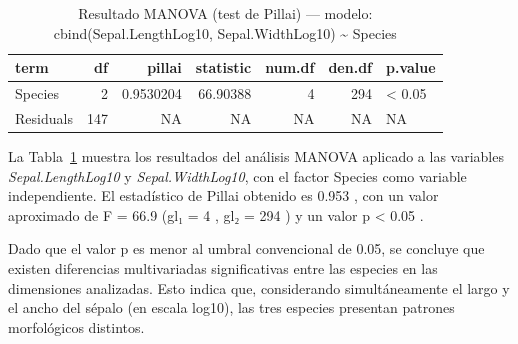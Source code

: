 \documentclass[
  spanish,
  11pt,
  a4paper,
  DIV=11,
  numbers=noendperiod]{scrartcl}
\newenvironment{Shaded}{\begin{snugshade}}{\end{snugshade}}
\newcommand{\AttributeTok}[1]{\textcolor[rgb]{0.40,0.45,0.13}{#1}}
\newcommand{\CommentTok}[1]{\textcolor[rgb]{0.37,0.37,0.37}{#1}}
\newcommand{\DecValTok}[1]{\textcolor[rgb]{0.68,0.00,0.00}{#1}}
\newcommand{\FloatTok}[1]{\textcolor[rgb]{0.68,0.00,0.00}{#1}}
\newcommand{\FunctionTok}[1]{\textcolor[rgb]{0.28,0.35,0.67}{#1}}
\newcommand{\NormalTok}[1]{\textcolor[rgb]{0.00,0.23,0.31}{#1}}
\newcommand{\OtherTok}[1]{\textcolor[rgb]{0.00,0.23,0.31}{#1}}
\newcommand{\SpecialCharTok}[1]{\textcolor[rgb]{0.37,0.37,0.37}{#1}}
\newcommand{\StringTok}[1]{\textcolor[rgb]{0.13,0.47,0.30}{#1}}
\begin{document}
\begin{longtable}[]{@{}lrrrrrl@{}}

\caption{\label{tbl-manova-fit}Resultado MANOVA (test de Pillai) ---
modelo: cbind(Sepal.LengthLog10, Sepal.WidthLog10) \textasciitilde{}
Species}

\tabularnewline

\toprule\noalign{}
term & df & pillai & statistic & num.df & den.df & p.value \\
\midrule\noalign{}
\endhead
\bottomrule\noalign{}
\endlastfoot
Species & 2 & 0.9530204 & 66.90388 & 4 & 294 & \textless{} 0.05 \\
Residuals & 147 & NA & NA & NA & NA & NA \\

\end{longtable}

La Tabla~\ref{tbl-manova-fit} muestra los resultados del análisis MANOVA
aplicado a las variables \emph{Sepal.LengthLog10} y
\emph{Sepal.WidthLog10}, con el factor Species como variable
independiente. El estadístico de Pillai obtenido es 0.953 , con un valor
aproximado de F = 66.9 (gl₁ = 4 , gl₂ = 294 ) y un valor p \textless{}
0.05 .

Dado que el valor p es menor al umbral convencional de 0.05, se concluye
que existen diferencias multivariadas significativas entre las especies
en las dimensiones analizadas. Esto indica que, considerando
simultáneamente el largo y el ancho del sépalo (en escala log10), las
tres especies presentan patrones morfológicos distintos.

\begin{Shaded}
\end{Shaded}
\end{document}
